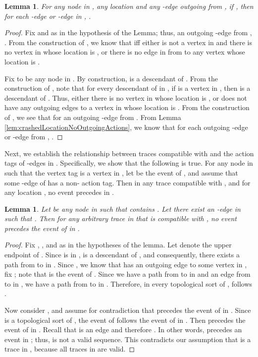 \documentclass[11pt]{article}
\numberwithin{theorem}{section}
\newtheorem{lemma}[theorem]{Lemma}
\begin{document}
\begin{lemma}\label{lem:crashedLocationNoActionsInSubtree}
For any node  in , any location  and any -edge  outgoing from , if , then for each -edge or -edge  in  ,  .
\end{lemma}
\begin{proof}
Fix  and  as in the hypothesis of the Lemma; thus, an outgoing -edge  from , . From the construction of , we know that  iff either  is not a vertex in  and there is no vertex in  whose location is , or there is no edge in  from  to any vertex whose location is .

Fix  to be any node in . By construction,  is a descendant of . From the construction of , note that for every descendant  of  in , if  is a vertex in , then  is a descendant of . Thus, either there is no vertex in  whose location is , or  does not have any outgoing edges to a vertex in  whose location is . From the construction of , we see that   for an outgoing -edge  from . From Lemma \ref{lem:crashedLocationNoOutgoingActions}, we know that  for each outgoing -edge or -edge  from , .
\end{proof}


Next, we establish the relationship between traces compatible with  and the action tags of -edges in . Specifically, we show that
the following is true. 
For any node  in  such that the vertex tag  is a vertex in , let  be the event of , and assume that some -edge of  has a non- action tag. Then  in any trace  compatible with , and for any location , no  event precedes  in .

\begin{lemma}\label{lem:noCrashIUntilBot}
 Let  be any node in  such that  contains .
Let there exist an -edge  in  such that . Then for any arbitrary trace in  that is compatible with , no  event precedes the event of  in .
\end{lemma}
\begin{proof}
Fix , , and  as in the hypotheses of the lemma. Let  denote the upper endpoint of .
Since  is in ,  is a descendant of , and consequently, there exists a path from  to  in . Since , we know that  has an outgoing edge to some vertex  in , fix ; note that  is the event of . Since we have a path from  to  in  and an edge from  to  in , we have a path from  to  in .
Therefore, in every topological sort of ,  follows .

Now consider , and assume for contradiction that  precedes the event of  in .
Since  is a topological sort of , the event  of  follows the event of  in .
Then  precedes the event  of  in . Recall that  is an  edge and therefore . In other words,  precedes an  event in ; thus,  is not a valid sequence. This contradicts our assumption that  is a trace in , because all traces in  are valid.
\end{proof}
\end{document}
